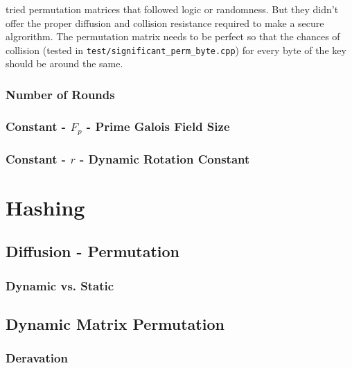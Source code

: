 \documentclass[fleqn, a4paper,12pt]{article}
\begin{document}
tried permutation matrices that followed logic or randomness. But they didn't offer the proper diffusion and collision resistance required to make a secure algrorithm. The permutation matrix needs to be perfect so that the chances of collision (tested in \texttt{test/significant\_perm\_byte.cpp}) for every byte of the key should be around the same.

\subsubsection{Number of Rounds}

\subsubsection{Constant - $F_p$ - Prime Galois Field Size} %

\subsubsection{Constant - $r$ - Dynamic Rotation Constant} %

\section{Hashing}



\subsection{Diffusion - Permutation}

\subsubsection{Dynamic vs. Static}

\subsection{Dynamic Matrix Permutation}



\subsubsection{Deravation}
\end{document}
